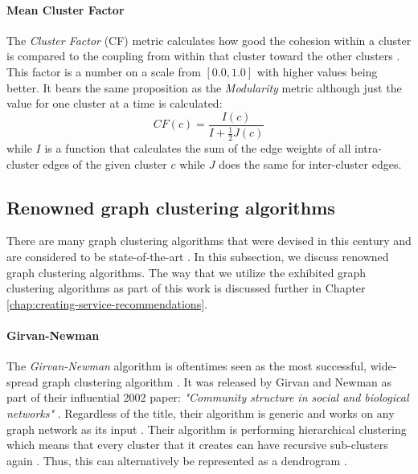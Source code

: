 \documentclass[12pt,a4paper]{report}
\begin{document}
\paragraph{Mean Cluster Factor}
The \textit{Cluster Factor} (CF) metric
calculates how good the cohesion within a cluster is compared to the coupling
from within that cluster toward the other clusters \cite{mitchell2006automatic}.
This factor is a number on a scale from \([0.0, 1.0]\) with higher values
being better. It bears the same proposition as the \textit{Modularity} metric
although just the value for one cluster at a time is calculated:
\[
  CF(c) = \frac{I(c)}{I + \frac{1}{2}J(c)}
\]
while $I$ is a function that calculates the
sum of the edge weights of all intra\hyp cluster edges of the given cluster $c$
while $J$ does the same for inter\hyp cluster edges.


\subsection{Renowned graph clustering algorithms} \label{subsect:renowned-graph-clustering-algorithms}

There are many graph clustering algorithms that were devised in this century
and are considered to be state-of-the-art \cite{lancichinetti2009community,
fortunato2010community, danon2005comparing}. In this subsection,
we discuss renowned graph clustering algorithms. The way that we
utilize the exhibited graph clustering algorithms as part of this work is
discussed further in Chapter \ref{chap:creating-service-recommendations}.

\paragraph{Girvan-Newman \cite{girvan2002community}}
The \textit{Girvan-Newman}
algorithm is oftentimes seen as the most successful, wide-spread graph
clustering algorithm \cite{lancichinetti2009community}. It was released by
Girvan and Newman as part of their influential 2002 paper: \textit{"Community
structure in social and biological networks"} \cite{girvan2002community}.
Regardless of the title, their algorithm is generic and works on any graph
network as its input \cite{lancichinetti2009community}. Their algorithm is
performing hierarchical clustering which means that every cluster that it
creates can have recursive sub-clusters again \cite{girvan2002community}. Thus,
this can alternatively be represented as a dendrogram \cite{newman2004fast}.
\end{document}

